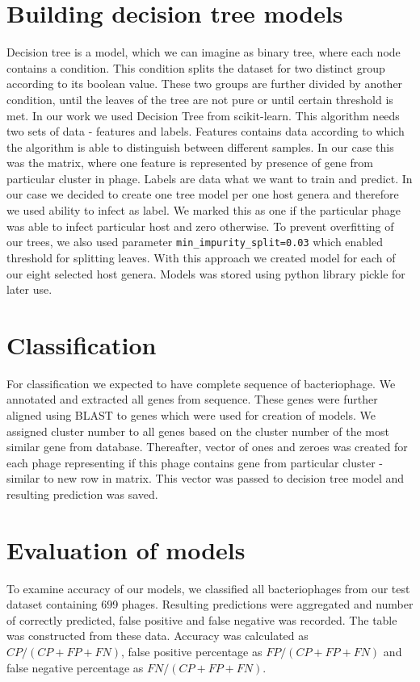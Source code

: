 \section{Building decision tree models}
Decision tree is a model, which we can imagine as binary tree, where each node contains a condition.
This condition splits the dataset for two distinct group according to its boolean value.
These two groups are further divided by another condition, until the leaves of the tree are not pure or until certain threshold is met.
In our work we used Decision Tree from scikit-learn. 
This algorithm needs two sets of data - features and labels.
Features contains data according to which the algorithm is able to distinguish between different samples.
In our case this was the matrix, where one feature is represented by presence of gene from particular cluster in phage.
Labels are data what we want to train and predict.
In our case we decided to create one tree model per one host genera and therefore we used ability to infect as label.
We marked this as one if the particular phage was able to infect particular host and zero otherwise.
To prevent overfitting of our trees, we also used parameter \verb|min_impurity_split=0.03| which enabled threshold for splitting leaves.
With this approach we created model for each of our eight selected host genera.
Models was stored using python library pickle for later use.


\section{Classification}
For classification we expected to have complete sequence of bacteriophage.
We annotated and extracted all genes from sequence.
These genes were further aligned using BLAST to genes which were used for creation of models.
We assigned cluster number to all genes based on the cluster number of the most similar gene from database.
Thereafter, vector of ones and zeroes was created for each phage representing if this phage contains gene from particular cluster - similar to new row in matrix.
This vector was passed to decision tree model and resulting prediction was saved.

\section{Evaluation of models}
To examine accuracy of our models, we classified all bacteriophages from our test dataset containing 699 phages.
Resulting predictions were aggregated and number of correctly predicted, false positive and false negative was recorded.
The table was constructed from these data.
Accuracy was calculated as $CP/(CP+FP+FN)$, false positive percentage as $FP/(CP+FP+FN)$ and false negative percentage as $FN/(CP+FP+FN)$.

